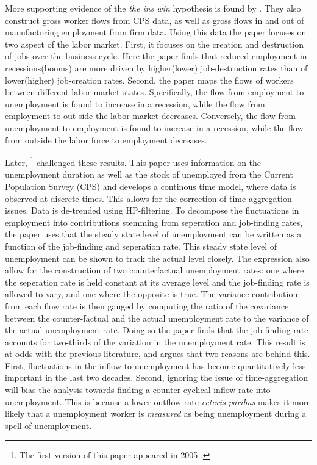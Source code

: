 More supporting evidence of the \emph{the ins win} hypothesis is found by \cite{Blanchard1990}. They also construct gross worker flows from CPS data, as well as gross flows in and out of manufactoring employment from firm data. Using this data the paper focuses on two aspect of the labor market. First, it focuses on the creation and destruction of jobs over the business cycle. Here the paper finds that reduced employment in recessions(booms) are more driven by higher(lower) job-destruction rates than of lower(higher) job-creation rates. Second, the paper maps the flows of workers between different labor market states. Specifically, the flow from employment to unemployment is found to increase in a recession, while the flow from employment to out-side the labor market decreases. Conversely, the flow from unemployment to employment is found to increase in a recession, while the flow from outside the labor force to employment decreases. 

Later, \cite{Shimer2012}\footnote{The first version of this paper appeared in 2005 \citep{Shimer2005b}.}  challenged these results. This paper uses information on the unemployment duration as well as the stock of unemployed from the Current Population Survey (CPS) and develops a continous time model, where data is observed at discrete times. This allows for the correction of time-aggregation issues. Data is de-trended using HP-filtering. To decompose the fluctuations in employment into contributions stemming from seperation and job-finding rates, the paper uses that the steady state level of unemployment can be written as a function of the job-finding and seperation rate. This steady state level of unemployment can be shown to track the actual level closely. The expression also allow for the construction of two counterfactual unemployment rates: one where the seperation rate is held constant at its average level and the job-finding rate is allowed to vary, and one where the opposite is true. The variance contribution from each flow rate is then gauged by computing the ratio of the covariance between the counter-factual and the actual unemployment rate to the variance of the actual unemployment rate. Doing so the paper finds that the job-finding rate accounts for two-thirds of the variation in the unemployment rate. This result is at odds with the previous literature, and \cite{Shimer2012} argues that two reasons are behind this. First, fluctuations in the inflow to unemployment has become quantitatively less important in the last two decades. Second, ignoring the issue of time-aggregation will bias the analysis towards finding a counter-cyclical inflow rate into unemployment. This is because a lower outflow rate \emph{ceteris paribus} makes it more likely that a unemployment worker is  \emph{measured} as being unemployment during a spell of unemployment.

